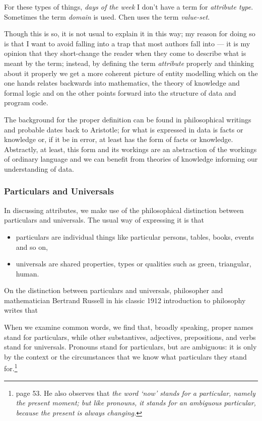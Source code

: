 \mynote For these types of things, \textit{days of the week} 
\mynote I don't have a term for \textit{attribute type}. 
\mynote Sometimes the term \textit{domain} is used.
\mynote Chen uses the term \textit{value-set}.

\mynote
Though this is so, it is not usual to explain it in this way; my reason for doing so is that
I want to avoid falling into a trap that most authors fall into ---
it is my opinion that they short-change the reader when they come to describe what is meant by the term; instead, by defining the term \textit{attribute} properly and thinking about it properly 
we get a more coherent picture of entity modelling 
which on the one hands relates backwards into mathematics, the theory of knowledge and formal logic and on the other
points forward into the structure of data and program code. 

\mynote The background for the proper definition can be found in philosophical writings and probable dates back to Aristotle; for what is expressed in data is facts or knowledge or, if it be in error, at least has the form of facts or knowledge. Abstractly, at least, this form and its workings are an abstraction of the workings of ordinary language and  we can benefit from theories of knowledge informing our understanding of data.

\subsubsection{Particulars and Universals}  
\mynote 
In discussing attributes, we make use of the philosophical distinction between particulars and universals. 
The usual way of expressing it is that 
\begin{itemize}
\item	particulars are individual things like particular persons, tables, books, events and so on, 
\item universals are shared properties, types or qualities such as green, triangular, human.
\end{itemize}
\mynote 
On the distinction between particulars and universals, philosopher and mathematician Bertrand Russell in his classic 1912 introduction to philosophy
writes that
\begin{erquote}
When we examine common words, we find that, broadly speaking, proper names stand for particulars, while other substantives, adjectives, prepositions, and verbs stand for universals. Pronouns stand for particulars, but are ambiguous: it is only by the context or the circumstances that we know what particulars they stand for.\footnote{page 53. He also observes that
\textit{the word `now' stands for a particular, namely the present moment; but like pronouns, it stands for an ambiguous particular, because the present is always changing.}}
\end{erquote}

